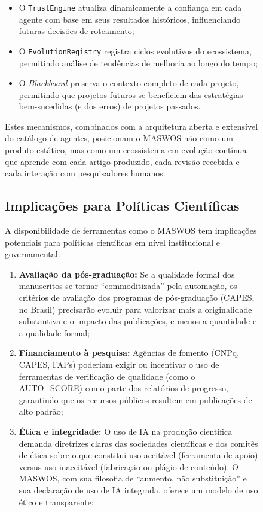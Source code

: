\begin{figure}
\begin{itemize}
    \item O \texttt{TrustEngine} atualiza dinamicamente a
    confiança em cada agente com base em seus resultados
    históricos, influenciando futuras decisões de roteamento;

    \item O \texttt{EvolutionRegistry} registra ciclos evolutivos
    do ecossistema, permitindo análise de tendências de melhoria
    ao longo do tempo;

    \item O \textit{Blackboard} preserva o contexto completo de
    cada projeto, permitindo que projetos futuros se beneficiem
    das estratégias bem-sucedidas (e dos erros) de projetos
    passados.
\end{itemize}

Estes mecanismos, combinados com a arquitetura aberta e extensível
do catálogo de agentes, posicionam o MASWOS não como um produto
estático, mas como um ecossistema em evolução contínua — que
aprende com cada artigo produzido, cada revisão recebida e cada
interação com pesquisadores humanos.

\subsection{Implicações para Políticas Científicas}
\label{sec:politicas_cientificas}

A disponibilidade de ferramentas como o MASWOS tem implicações
potenciais para políticas científicas em nível institucional e
governamental:

\begin{enumerate}
    \item \textbf{Avaliação da pós-graduação:} Se a qualidade
    formal dos manuscritos se tornar ``commoditizada'' pela
    automação, os critérios de avaliação dos programas de
    pós-graduação (CAPES, no Brasil) precisarão evoluir para
    valorizar mais a originalidade substantiva e o impacto das
    publicações, e menos a quantidade e a qualidade formal;

    \item \textbf{Financiamento à pesquisa:} Agências de fomento
    (CNPq, CAPES, FAPs) poderiam exigir ou incentivar o uso de
    ferramentas de verificação de qualidade (como o AUTO\_SCORE)
    como parte dos relatórios de progresso, garantindo que os
    recursos públicos resultem em publicações de alto padrão;

    \item \textbf{Ética e integridade:} O uso de IA na produção
    científica demanda diretrizes claras das sociedades
    científicas e dos comitês de ética sobre o que constitui uso
    aceitável (ferramenta de apoio) versus uso inaceitável
    (fabricação ou plágio de conteúdo). O MASWOS, com sua
    filosofia de ``aumento, não substituição'' e sua declaração
    de uso de IA integrada, oferece um modelo de uso ético e
    transparente;


\end{enumerate}
\end{figure}
